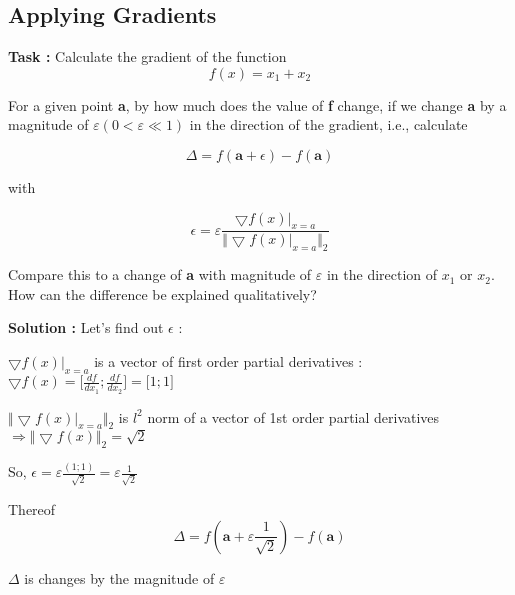 \documentclass{scrartcl}
\begin{document}
\subsection{Applying Gradients}
\textbf{Task :} Calculate the gradient of the function \[f(x) = x_1 + x_2 \]

For a given point \textbf{a}, by how much does the value of \textbf{f} change, if we change \textbf{a} by a magnitude of \(\varepsilon (0 < \varepsilon \ll 1) \)  in the direction of the gradient, i.e., calculate

\[ \Delta = f(\textbf{a} + \epsilon) - f(\textbf{a})\]

with 

\[ \epsilon = \varepsilon \frac{\bigtriangledown f(x) \vert_{x=a}}{\Vert \bigtriangledown f(x) \vert_{x=a} \Vert_2}   \]

Compare this to a change of \textbf{a} with magnitude of \( \varepsilon \) in the direction of $x_1$ or $x_2$. How
can the difference be explained qualitatively?

\textbf{Solution :} Let's find out \( \epsilon \) :

\( \bigtriangledown f(x) \vert_{x=a} \) is a vector of first order partial derivatives : \( \bigtriangledown f(x) = \big[\frac{df}{dx_1}; \frac{df}{dx_2} \big] = \big[ 1; 1 \big]\)

\(\Vert \bigtriangledown f(x) \vert_{x=a} \Vert_2 \) is $l^2$ norm of a vector of 1st order partial derivatives \( \Rightarrow  \Vert\bigtriangledown f(x) \Vert_2 = \sqrt{2} \)

So, \( \epsilon = \varepsilon \frac{(1; 1)}{\sqrt{2}} = \varepsilon \frac{1}{\sqrt{2}} \)

Thereof \[ \Delta = f(\textbf{a} + \varepsilon \frac{1}{\sqrt{2}}) - f(\textbf{a})\]

\( \Delta \) is changes by the magnitude of \( \varepsilon \)
\end{document}

